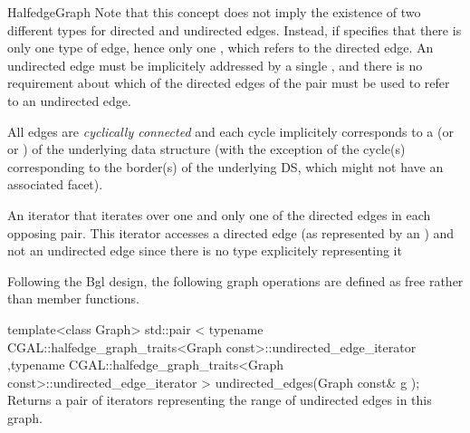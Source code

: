 \begin{ccRefConcept}{HalfedgeGraph}
Note that this concept does not imply the existence of two different types
for directed and undirected edges. Instead, if specifies that there is only one type of edge,
hence only one , which refers to the directed edge.
An undirected edge must be implicitely addressed by a single ,
and there is no requirement about which of the directed edges of the pair must
be used to refer to an undirected edge.

All edges are {\em cyclically connected} and each cycle implicitely
corresponds to a  (or  or ) of the
underlying data structure (with the exception of the cycle(s)
corresponding to the border(s) of the underlying DS, which might not
have an associated facet).


\ccRefines
{}

\ccTypes
  {An iterator that iterates over one and only one of the directed edges
  in each opposing pair. This iterator accesses a directed edge 
  (as represented by an ) and not an undirected edge 
  since there is no type explicitely representing it}{}
  
\ccOperations

Following the {\sc Bgl} design, the following graph operations are defined as free rather than member functions.

  \ccFunction
  {template<class Graph>
  std::pair < typename CGAL::halfedge_graph_traits<Graph const>::undirected_edge_iterator
             ,typename CGAL::halfedge_graph_traits<Graph const>::undirected_edge_iterator
             >   
  undirected_edges(Graph const& g );
  }
  {Returns a pair of iterators representing the range \ccc{[begin,end)} 
  of undirected edges in this graph.}

\ccHasModels
{}\\

\end{ccRefConcept}

